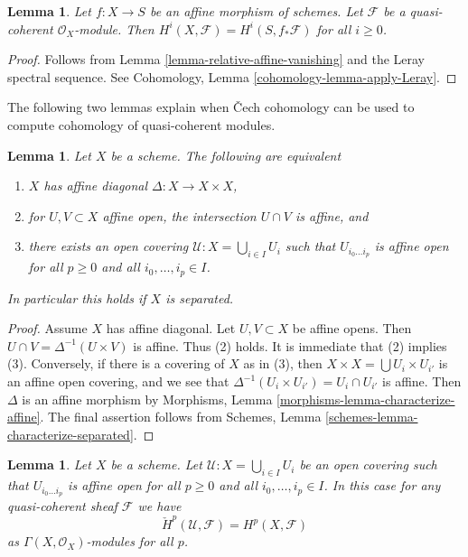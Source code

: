 \documentclass{stacks-project}
\theoremstyle{plain}
\newtheorem{lemma}[subsection]{Lemma}
\theoremstyle{definition}
\theoremstyle{remark}
\numberwithin{equation}{subsection}
\begin{document}
\begin{lemma}
\label{lemma-relative-affine-cohomology}
Let $f : X \to S$ be an affine morphism of schemes.
Let $\mathcal{F}$ be a quasi-coherent $\mathcal{O}_X$-module.
Then $H^i(X, \mathcal{F}) = H^i(S, f_*\mathcal{F})$ for all $i \geq 0$.
\end{lemma}

\begin{proof}
Follows from Lemma \ref{lemma-relative-affine-vanishing}
and the Leray spectral sequence. See
Cohomology, Lemma \ref{cohomology-lemma-apply-Leray}.
\end{proof}

\noindent
The following two lemmas explain when {\v C}ech cohomology
can be used to compute cohomology of quasi-coherent modules.

\begin{lemma}
\label{lemma-affine-diagonal}
Let $X$ be a scheme. The following are equivalent
\begin{enumerate}
\item $X$ has affine diagonal $\Delta : X \to X \times X$,
\item for $U, V \subset X$ affine open, the intersection
$U \cap V$ is affine, and
\item there exists an open covering $\mathcal{U} : X = \bigcup_{i \in I} U_i$
such that $U_{i_0 \ldots i_p}$ is affine open for all $p \ge 0$ and all
$i_0, \ldots, i_p \in I$.
\end{enumerate}
In particular this holds if $X$ is separated.
\end{lemma}

\begin{proof}
Assume $X$ has affine diagonal. Let $U, V \subset X$ be affine opens.
Then $U \cap V = \Delta^{-1}(U \times V)$ is affine. Thus (2) holds.
It is immediate that (2) implies (3). Conversely, if there is a
covering of $X$ as in (3), then $X \times X = \bigcup U_i \times U_{i'}$
is an affine open covering, and we see that
$\Delta^{-1}(U_i \times U_{i'}) = U_i \cap U_{i'}$
is affine. Then $\Delta$ is an affine morphism by
Morphisms, Lemma \ref{morphisms-lemma-characterize-affine}.
The final assertion follows from Schemes, Lemma
\ref{schemes-lemma-characterize-separated}.
\end{proof}

\begin{lemma}
\label{lemma-cech-cohomology-quasi-coherent}
Let $X$ be a scheme.
Let $\mathcal{U} : X = \bigcup_{i \in I} U_i$ be an open covering such that
$U_{i_0 \ldots i_p}$ is affine open for all $p \ge 0$ and all
$i_0, \ldots, i_p \in I$.
In this case for any quasi-coherent sheaf $\mathcal{F}$ we have
$$
\check{H}^p(\mathcal{U}, \mathcal{F}) = H^p(X, \mathcal{F})
$$
as $\Gamma(X, \mathcal{O}_X)$-modules for all $p$.
\end{lemma}
\end{document}
